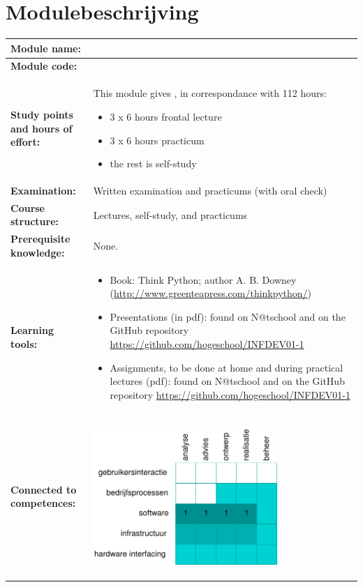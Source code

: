 \section*{Modulebeschrijving}
\begin{tabularx}{\textwidth}{|>{\columncolor{lichtGrijs}} p{}|X|}
	\hline
	\textbf{Module name:} & \modulenaam\\
	\hline
	\textbf{Module code: }& \modulecode\\
	\hline
	\textbf{Study points \newline and hours of effort:} & This module gives \stdPunten, in correspondance with 112 hours:
	\begin{itemize}
		\item 3 x 6 hours frontal lecture
		\item 3 x 6 hours practicum
		\item the rest is self-study
	\end{itemize} \\
	\hline
	\textbf{Examination:} & Written examination and practicums (with oral check) \\
	\hline
	\textbf{Course structure:} & Lectures, self-study, and practicums \\
	\hline
	\textbf{Prerequisite knowledge:} & None. \\
	\hline
	\textbf{Learning tools:}  &
		\begin{itemize}
			\item Book: Think Python; author A. B. Downey (\url{http://www.greenteapress.com/thinkpython/})
			\item Presentations (in pdf): found on N@tschool and on the GitHub repository \url{https://github.com/hogeschool/INFDEV01-1}
			\item Assignments, to be done at home and during practical lectures (pdf): found on N@tschool and on the GitHub repository \url{https://github.com/hogeschool/INFDEV01-1}
		\end{itemize} \\
	\hline
	\textbf{Connected to \newline competences:} &
	\begin{center}
		\includegraphics[width=7cm]{img/comptabel.pdf}

\end{center}
\end{tabularx}
